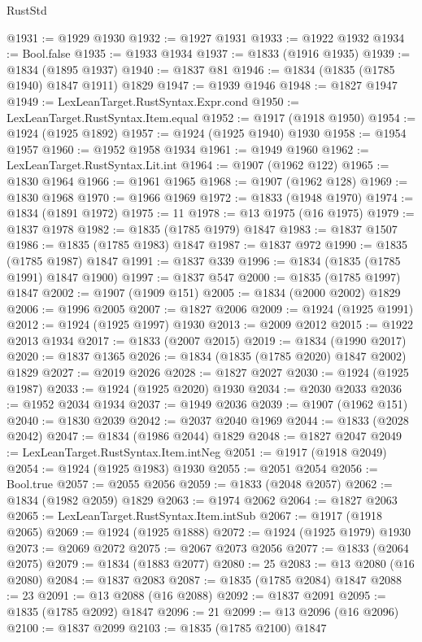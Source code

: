 \begin{lexlean}{RustStd}
\begin{coremodule}
@1931 := @1929 @1930
@1932 := @1927 @1931
@1933 := @1922 @1932
@1934 := Bool.false
@1935 := @1933 @1934
@1937 := @1833 (@1916 @1935)
@1939 := @1834 (@1895 @1937)
@1940 := @1837 @81
@1946 := @1834 (@1835 (@1785 @1940) @1847 @1911) @1829
@1947 := @1939 @1946
@1948 := @1827 @1947
@1949 := LexLeanTarget.RustSyntax.Expr.cond
@1950 := LexLeanTarget.RustSyntax.Item.equal
@1952 := @1917 (@1918 @1950)
@1954 := @1924 (@1925 @1892)
@1957 := @1924 (@1925 @1940) @1930
@1958 := @1954 @1957
@1960 := @1952 @1958 @1934
@1961 := @1949 @1960
@1962 := LexLeanTarget.RustSyntax.Lit.int
@1964 := @1907 (@1962 @122)
@1965 := @1830 @1964
@1966 := @1961 @1965
@1968 := @1907 (@1962 @128)
@1969 := @1830 @1968
@1970 := @1966 @1969
@1972 := @1833 (@1948 @1970)
@1974 := @1834 (@1891 @1972)
@1975 := 11
@1978 := @13 @1975 (@16 @1975)
@1979 := @1837 @1978
@1982 := @1835 (@1785 @1979) @1847
@1983 := @1837 @1507
@1986 := @1835 (@1785 @1983) @1847
@1987 := @1837 @972
@1990 := @1835 (@1785 @1987) @1847
@1991 := @1837 @339
@1996 := @1834 (@1835 (@1785 @1991) @1847 @1900)
@1997 := @1837 @547
@2000 := @1835 (@1785 @1997) @1847
@2002 := @1907 (@1909 @151)
@2005 := @1834 (@2000 @2002) @1829
@2006 := @1996 @2005
@2007 := @1827 @2006
@2009 := @1924 (@1925 @1991)
@2012 := @1924 (@1925 @1997) @1930
@2013 := @2009 @2012
@2015 := @1922 @2013 @1934
@2017 := @1833 (@2007 @2015)
@2019 := @1834 (@1990 @2017)
@2020 := @1837 @1365
@2026 := @1834 (@1835 (@1785 @2020) @1847 @2002) @1829
@2027 := @2019 @2026
@2028 := @1827 @2027
@2030 := @1924 (@1925 @1987)
@2033 := @1924 (@1925 @2020) @1930
@2034 := @2030 @2033
@2036 := @1952 @2034 @1934
@2037 := @1949 @2036
@2039 := @1907 (@1962 @151)
@2040 := @1830 @2039
@2042 := @2037 @2040 @1969
@2044 := @1833 (@2028 @2042)
@2047 := @1834 (@1986 @2044) @1829
@2048 := @1827 @2047
@2049 := LexLeanTarget.RustSyntax.Item.intNeg
@2051 := @1917 (@1918 @2049)
@2054 := @1924 (@1925 @1983) @1930
@2055 := @2051 @2054
@2056 := Bool.true
@2057 := @2055 @2056
@2059 := @1833 (@2048 @2057)
@2062 := @1834 (@1982 @2059) @1829
@2063 := @1974 @2062
@2064 := @1827 @2063
@2065 := LexLeanTarget.RustSyntax.Item.intSub
@2067 := @1917 (@1918 @2065)
@2069 := @1924 (@1925 @1888)
@2072 := @1924 (@1925 @1979) @1930
@2073 := @2069 @2072
@2075 := @2067 @2073 @2056
@2077 := @1833 (@2064 @2075)
@2079 := @1834 (@1883 @2077)
@2080 := 25
@2083 := @13 @2080 (@16 @2080)
@2084 := @1837 @2083
@2087 := @1835 (@1785 @2084) @1847
@2088 := 23
@2091 := @13 @2088 (@16 @2088)
@2092 := @1837 @2091
@2095 := @1835 (@1785 @2092) @1847
@2096 := 21
@2099 := @13 @2096 (@16 @2096)
@2100 := @1837 @2099
@2103 := @1835 (@1785 @2100) @1847

\end{coremodule}
\end{lexlean}
